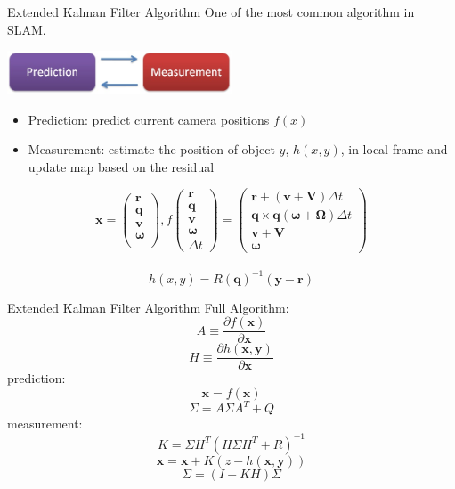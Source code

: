 \documentclass{beamer}
\begin{document}
	\begin{frame}{Extended Kalman Filter Algorithm}
		One of the most common algorithm in SLAM.\\
		\uncover<2->
		{
			\begin{center}
				\includegraphics[width=0.5\textwidth]{./pics/ekf.jpg} 
			\end{center}
			\begin{itemize}
				\item Prediction: predict current camera positions \alert{$f(x)$}
				\item Measurement: estimate the position of object $y$, \alert{$h(x,y)$}, in local frame and update map based on the residual
			\end{itemize}
		}
		{
			\[
			\mathbf{x} = \left( 
			\begin{array}{c} 
				\mathbf{r}\\
				\mathbf{q}\\
				\mathbf{v}\\
				\mathbf{\omega}\\
			\end{array}
			\right),  
			f\left( 
			\begin{array}{c} 
				\mathbf{r}\\
				\mathbf{q}\\
				\mathbf{v}\\
				\mathbf{\omega}\\
				\Delta t
			\end{array} 
			\right) = 
			\left( 
			\begin{array}{c}
				\mathbf{r} + (\mathbf{v}+\mathbf{V})\Delta t\\
				\mathbf{q} \times \mathbf{q}(\mathbf{\omega}+\mathbf{\Omega})\Delta t\\
				\mathbf{v} + \mathbf{V}\\
				\mathbf{\omega} 
			\end{array} 
			\right)
			\] \\

			\[ h(x,y) = R(\mathbf{q})^{-1}( \mathbf{y}-\mathbf{r} ) \]
		}
	\end{frame}

	\begin{frame}{Extended Kalman Filter Algorithm}
		Full Algorithm: \\
		\[ A \equiv \frac{ \partial f(\mathbf{x}) }{ \partial \mathbf{x} } \]
		\[ H \equiv \frac{ \partial h(\mathbf{x},\mathbf{y}) }{ \partial \mathbf{x} } \]
		prediction:\\
		\[\mathbf{x} = f(\mathbf{x})\]
		\[\Sigma = A\Sigma A^{T} + Q\]
		measurement:\\
		\[K = \Sigma H^{T}(H\Sigma H^{T}+R)^{-1}\]
		\[\mathbf{x} = \mathbf{x}+K(z-h(\mathbf{x},\mathbf{y}))\]
		\[\Sigma = (I-KH)\Sigma\]


	\end{frame}
\end{document}
